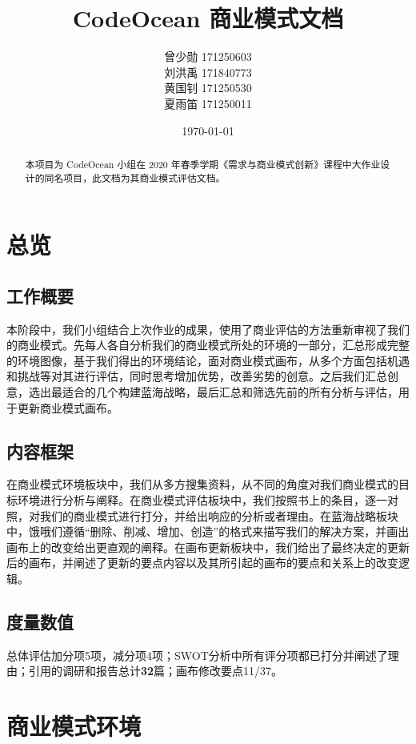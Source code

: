 \documentclass[a4paper]{ctexart}
\title{CodeOcean 商业模式文档}
\author{
  曾少勋 171250603\\
  刘洪禹 171840773\\
  黄国钊 171250530\\
  夏雨笛 171250011\\
}
\date{\today}
\begin{document}
\maketitle

\begin{abstract}
  本项目为 CodeOcean 小组在 2020 年春季学期《需求与商业模式创新》课程中大作业设计的同名项目，此文档为其商业模式评估文档。
\end{abstract}

\tableofcontents

\newpage

\setlength{\parskip}{1em}

\section{总览}
\subsection{工作概要}
本阶段中，我们小组结合上次作业的成果，使用了商业评估的方法重新审视了我们的商业模式。先每人各自分析我们的商业模式所处的环境的一部分，汇总形成完整的环境图像，基于我们得出的环境结论，面对商业模式画布，从多个方面包括机遇和挑战等对其进行评估，同时思考增加优势，改善劣势的创意。之后我们汇总创意，选出最适合的几个构建蓝海战略，最后汇总和筛选先前的所有分析与评估，用于更新商业模式画布。

\subsection{内容框架}
在商业模式环境板块中，我们从多方搜集资料，从不同的角度对我们商业模式的目标环境进行分析与阐释。在商业模式评估板块中，我们按照书上的条目，逐一对照，对我们的商业模式进行打分，并给出响应的分析或者理由。在蓝海战略板块中，饿哦们遵循“删除、削减、增加、创造”的格式来描写我们的解决方案，并画出画布上的改变给出更直观的阐释。在画布更新板块中，我们给出了最终决定的更新后的画布，并阐述了更新的要点内容以及其所引起的画布的要点和关系上的改变逻辑。

\subsection{度量数值}
总体评估加分项5项，减分项4项；SWOT分析中所有评分项都已打分并阐述了理由；引用的调研和报告总计\textbf{32}篇；画布修改要点11/37。

\section{商业模式环境}
\end{document}
